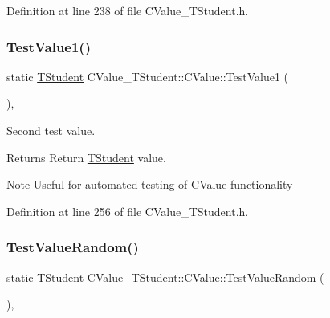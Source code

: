 Definition at line 238 of file C\+Value\+\_\+\+T\+Student.\+h.

\mbox{\label{class_c_value___t_student_1_1_c_value_a41c8aac60fd9651de611ce2220d3f352}} 
\subsubsection{\texorpdfstring{Test\+Value1()}{TestValue1()}}
{\footnotesize\ttfamily static \hyperlink{struct_c_value___t_student_1_1_t_student}{T\+Student} C\+Value\+\_\+\+T\+Student\+::\+C\+Value\+::\+Test\+Value1 (\begin{DoxyParamCaption}{ }\end{DoxyParamCaption})\hspace{0.3cm}{\ttfamily [inline]}, {\ttfamily [static]}}



Second test value. 

\begin{DoxyReturn}{Returns}
Return \hyperlink{struct_c_value___t_student_1_1_t_student}{T\+Student} value. 
\end{DoxyReturn}
\begin{DoxyNote}{Note}
Useful for automated testing of \hyperlink{class_c_value___t_student_1_1_c_value}{C\+Value} functionality 
\end{DoxyNote}


Definition at line 256 of file C\+Value\+\_\+\+T\+Student.\+h.

\mbox{\label{class_c_value___t_student_1_1_c_value_a86cd62d595805bfaaa99c7519fddff21}} 
\subsubsection{\texorpdfstring{Test\+Value\+Random()}{TestValueRandom()}}
{\footnotesize\ttfamily static \hyperlink{struct_c_value___t_student_1_1_t_student}{T\+Student} C\+Value\+\_\+\+T\+Student\+::\+C\+Value\+::\+Test\+Value\+Random (\begin{DoxyParamCaption}{ }\end{DoxyParamCaption})\hspace{0.3cm}{\ttfamily [inline]}, {\ttfamily [static]}}



